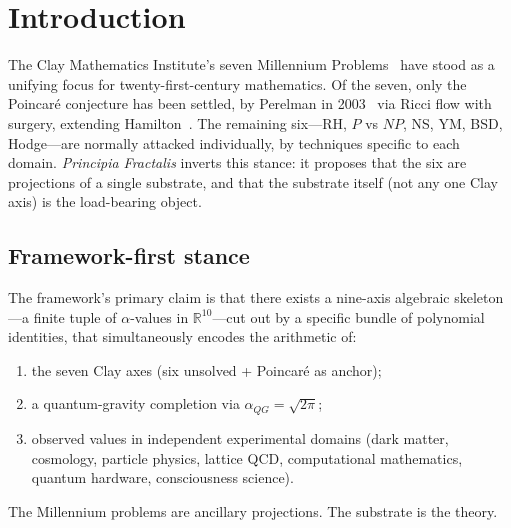 \documentclass[11pt,a4paper]{amsart}
\theoremstyle{plain}
\theoremstyle{definition}
\newcommand{\Rl}{\mathbb{R}}
\newcommand{\aQG}{\alpha_{QG}}
\begin{document}
\maketitle

\tableofcontents

\section{Introduction}
\label{sec:intro}

The Clay Mathematics Institute's seven Millennium Problems~\cite{cmi2000}
have stood as a unifying focus for twenty-first-century mathematics. Of the
seven, only the Poincar\'e conjecture has been settled, by Perelman in
2003~\cite{perelman2003} via Ricci flow with surgery, extending
Hamilton~\cite{hamilton1982}. The remaining six---RH, $P$ vs $NP$, NS, YM,
BSD, Hodge---are normally attacked individually, by techniques specific to
each domain. \emph{Principia Fractalis} inverts this stance: it proposes
that the six are projections of a single substrate, and that the substrate
itself (not any one Clay axis) is the load-bearing object.

\subsection{Framework-first stance}
The framework's primary claim is that there exists a nine-axis algebraic
skeleton---a finite tuple of $\alpha$-values in $\Rl^{10}$---cut out by a
specific bundle of polynomial identities, that simultaneously encodes the
arithmetic of:
\begin{enumerate}[label=(\roman*)]
\item the seven Clay axes (six unsolved + Poincar\'e as anchor);
\item a quantum-gravity completion via $\aQG = \sqrt{2\pi}$;
\item observed values in independent experimental domains (dark matter,
cosmology, particle physics, lattice QCD, computational mathematics,
quantum hardware, consciousness science).
\end{enumerate}
The Millennium problems are ancillary projections. The substrate is the
theory.
\end{document}
